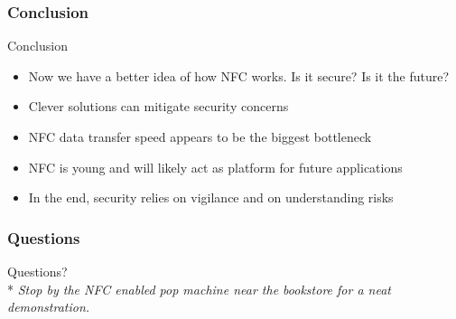 \documentclass[unknownkeysallowed]{beamer}
\begin{document}
\begin{frame}
\frametitle{Conclusion}
  \begin{center}
  \begin{minipage}{.9\textwidth}
  \begin{block}{Conclusion}
    \begin{itemize}
      \item{Now we have a better idea of how NFC works. Is it secure? Is it the future?}
      \pause
      \vspace{1mm}
      \item{Clever solutions can mitigate security concerns}
      \pause
      \vspace{1mm}
      \item{NFC data transfer speed appears to be the biggest bottleneck}
      \pause
      \vspace{1mm}
      \item{NFC is young and will likely act as platform for future applications}
      \pause
      \vspace{1mm}
      \item{In the end, security relies on vigilance and on understanding risks}
    \end{itemize}
  \end{block}
  \end{minipage}
  \end{center}
\end{frame}

\begin{frame}
  \frametitle{Questions}
  \begin{center}
    {\huge \textcolor{uipoppy}{Questions?}}\\*
        \vspace{.7cm}
        \textcolor{uipaleblue}{\textit{Stop by the NFC enabled pop machine near the bookstore for a neat demonstration.}}
\end{center}
\end{frame}
\end{document}
